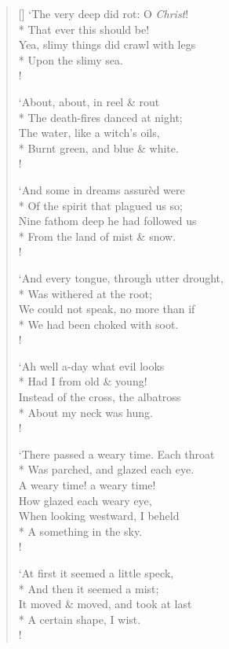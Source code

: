 \documentclass[MAIN]{subfiles}
\begin{document}
\begin{verse}[\versewidth]
`The very deep did rot: O \emph{Christ}!\\*
\vin That ever this should be!\\
Yea, slimy things did crawl with legs\\*
\vin Upon the slimy sea.\\!

`About, about, in reel \& rout\\*
\vin The death-fires danced at night;\\ 
The water, like a witch's oils,\\*
\vin Burnt green, and blue \& white.\\!

`And some in dreams assur\`ed were\\*
\vin Of the spirit that plagued us so;\\
Nine fathom deep he had followed us\\*
\vin From the land of mist \& snow.\\!

`And every tongue, through utter drought,\\*
\vin Was withered at the root;\\
We could not speak, no more than if\\*
\vin We had been choked with soot.\\!

`Ah well a-day what evil looks\\*
\vin Had I from old \& young!\\
Instead of the cross, the albatross\\*
\vin About my neck was hung.\\!

 `There passed a weary time. Each throat\\*
\vin Was parched, and glazed each eye.\\
A weary time! a weary time!\\
\vin How glazed each weary eye,\\
When looking westward, I beheld\\*
\vin A something in the sky.\\!

`At first it seemed a little speck,\\*
\vin And then it seemed a mist;\\
It moved \& moved, and took at last\\*
\vin A certain shape, I wist.\\!


\end{verse}
\end{document}
